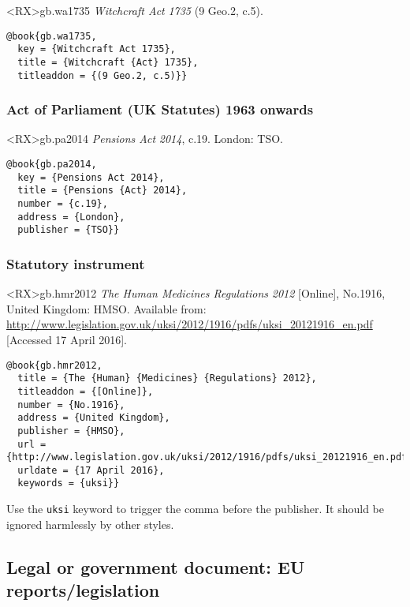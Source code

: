 \documentclass[10pt,a4paper]{article}
\newenvironment{tips}{%
  \begin{list}{\makebox[2em][c]{\faLightbulbO}}{%
    \setlength{\leftmargin}{2em}
    \setlength{\labelwidth}{2em}
    \setlength{\labelsep}{0pt}}
}{\end{list}}
\begin{document}
\begin{bibexbox}<RX>{gb.wa1735}
  \emph{Witchcraft Act} \emph{1735} (9 Geo.2, c.5).
  \tcblower
\begin{Verbatim}
@book{gb.wa1735,
  key = {Witchcraft Act 1735},
  title = {Witchcraft {Act} 1735},
  titleaddon = {(9 Geo.2, c.5)}}
\end{Verbatim}
\end{bibexbox}

\subsubsection*{Act of Parliament (UK Statutes) 1963 onwards}

\begin{bibexbox}<RX>{gb.pa2014}
  \emph{Pensions Act} \emph{2014}, c.19. London: TSO.
  \tcblower
\begin{Verbatim}
@book{gb.pa2014,
  key = {Pensions Act 2014},
  title = {Pensions {Act} 2014},
  number = {c.19},
  address = {London},
  publisher = {TSO}}
\end{Verbatim}
\end{bibexbox}


\subsubsection*{Statutory instrument}

\begin{bibexbox}<RX>{gb.hmr2012}
  \emph{The Human Medicines Regulations} \emph{2012} [Online], No.1916, United Kingdom: HMSO. Available from: \url{http://www.legislation.gov.uk/uksi/2012/1916/pdfs/uksi_20121916_en.pdf} [Accessed 17 April 2016].
  \tcblower
\begin{Verbatim}
@book{gb.hmr2012,
  title = {The {Human} {Medicines} {Regulations} 2012},
  titleaddon = {[Online]},
  number = {No.1916},
  address = {United Kingdom},
  publisher = {HMSO},
  url = {http://www.legislation.gov.uk/uksi/2012/1916/pdfs/uksi_20121916_en.pdf},
  urldate = {17 April 2016},
  keywords = {uksi}}
\end{Verbatim}
\end{bibexbox}

\begin{tips}\item
Use the \texttt{uksi} keyword to trigger the comma before the publisher.
It should be ignored harmlessly by other styles.
\end{tips}

\subsection{Legal or government document: EU reports\slash legislation}
\end{document}
